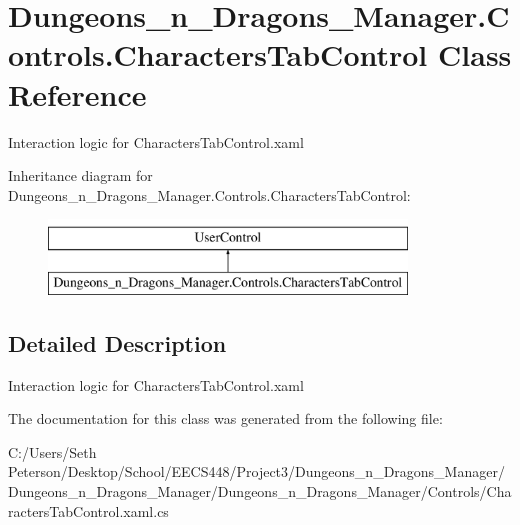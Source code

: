\hypertarget{class_dungeons__n___dragons___manager_1_1_controls_1_1_characters_tab_control}{}\section{Dungeons\+\_\+n\+\_\+\+Dragons\+\_\+\+Manager.\+Controls.\+Characters\+Tab\+Control Class Reference}
\label{class_dungeons__n___dragons___manager_1_1_controls_1_1_characters_tab_control}


Interaction logic for Characters\+Tab\+Control.\+xaml  


Inheritance diagram for Dungeons\+\_\+n\+\_\+\+Dragons\+\_\+\+Manager.\+Controls.\+Characters\+Tab\+Control\+:\begin{figure}[H]
\begin{center}
\leavevmode
\includegraphics[height=2.000000cm]{class_dungeons__n___dragons___manager_1_1_controls_1_1_characters_tab_control}
\end{center}
\end{figure}


\subsection{Detailed Description}
Interaction logic for Characters\+Tab\+Control.\+xaml 



The documentation for this class was generated from the following file\+:\begin{DoxyCompactItemize}
\item 
C\+:/\+Users/\+Seth Peterson/\+Desktop/\+School/\+E\+E\+C\+S448/\+Project3/\+Dungeons\+\_\+n\+\_\+\+Dragons\+\_\+\+Manager/\+Dungeons\+\_\+n\+\_\+\+Dragons\+\_\+\+Manager/\+Dungeons\+\_\+n\+\_\+\+Dragons\+\_\+\+Manager/\+Controls/Characters\+Tab\+Control.\+xaml.\+cs\end{DoxyCompactItemize}
